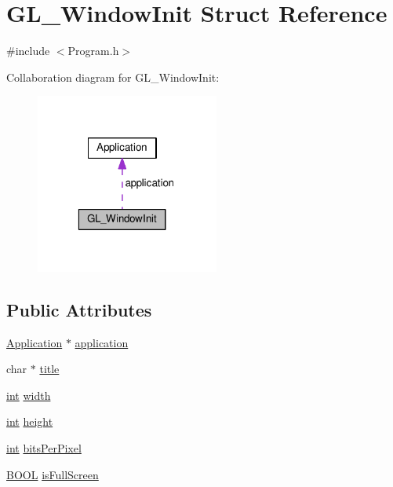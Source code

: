 \hypertarget{struct_g_l___window_init}{\section{G\+L\+\_\+\+Window\+Init Struct Reference}
\label{struct_g_l___window_init}
}


{\ttfamily \#include $<$Program.\+h$>$}



Collaboration diagram for G\+L\+\_\+\+Window\+Init\+:\nopagebreak
\begin{figure}[H]
\begin{center}
\leavevmode
\includegraphics[width=171pt]{struct_g_l___window_init__coll__graph}
\end{center}
\end{figure}
\subsection*{Public Attributes}
\begin{DoxyCompactItemize}
\item 
\hyperlink{struct_application}{Application} $\ast$ \hyperlink{struct_g_l___window_init_afde844f257aafdb31bd03338723a2206}{application}
\item 
char $\ast$ \hyperlink{struct_g_l___window_init_a64c652d1fb4e2afa60b30fca91920ed4}{title}
\item 
\hyperlink{wglext_8h_a500a82aecba06f4550f6849b8099ca21}{int} \hyperlink{struct_g_l___window_init_a1a1c2cd5a8bc6b90987885307c296d9f}{width}
\item 
\hyperlink{wglext_8h_a500a82aecba06f4550f6849b8099ca21}{int} \hyperlink{struct_g_l___window_init_a8413cf084b2d4e7056da68940ab1438e}{height}
\item 
\hyperlink{wglext_8h_a500a82aecba06f4550f6849b8099ca21}{int} \hyperlink{struct_g_l___window_init_aa4220e9602ef12719a010e049a42fcea}{bits\+Per\+Pixel}
\item 
\hyperlink{wglext_8h_a05538ca0e53ef21cb679e6de0fef7f8e}{B\+O\+O\+L} \hyperlink{struct_g_l___window_init_a217a2406116f019e13094868c1810a32}{is\+Full\+Screen}
\end{DoxyCompactItemize}


